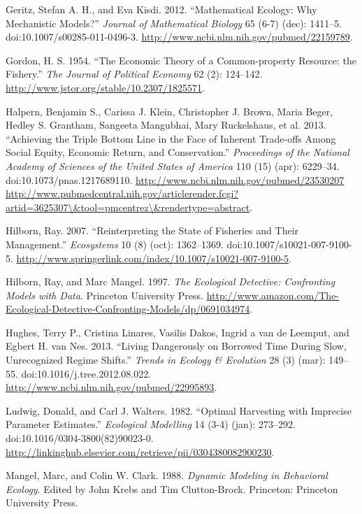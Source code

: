 \documentclass[author-year, review]{elsarticle} %
\begin{document}
Geritz, Stefan A. H., and Eva Kisdi. 2012. ``Mathematical Ecology: Why
Mechanistic Models?'' \emph{Journal of Mathematical Biology} 65 (6-7)
(dec): 1411--5. doi:10.1007/s00285-011-0496-3.
\url{http://www.ncbi.nlm.nih.gov/pubmed/22159789}.

Gordon, H. S. 1954. ``The Economic Theory of a Common-property Resource:
the Fishery.'' \emph{The Journal of Political Economy} 62 (2): 124--142.
\url{http://www.jstor.org/stable/10.2307/1825571}.

Halpern, Benjamin S., Carissa J. Klein, Christopher J. Brown, Maria
Beger, Hedley S. Grantham, Sangeeta Mangubhai, Mary Ruckelshaus, et al.
2013. ``Achieving the Triple Bottom Line in the Face of Inherent
Trade-offs Among Social Equity, Economic Return, and Conservation.''
\emph{Proceedings of the National Academy of Sciences of the United
States of America} 110 (15) (apr): 6229--34.
doi:10.1073/pnas.1217689110.
\href{http://www.ncbi.nlm.nih.gov/pubmed/23530207 http://www.pubmedcentral.nih.gov/articlerender.fcgi?artid=3625307/\&tool=pmcentrez/\&rendertype=abstract}{http://www.ncbi.nlm.nih.gov/pubmed/23530207
http://www.pubmedcentral.nih.gov/articlerender.fcgi?artid=3625307\textbackslash{}\&tool=pmcentrez\textbackslash{}\&rendertype=abstract}.

Hilborn, Ray. 2007. ``Reinterpreting the State of Fisheries and Their
Management.'' \emph{Ecosystems} 10 (8) (oct): 1362--1369.
doi:10.1007/s10021-007-9100-5.
\url{http://www.springerlink.com/index/10.1007/s10021-007-9100-5}.

Hilborn, Ray, and Marc Mangel. 1997. \emph{The Ecological Detective:
Confronting Models with Data}. Princeton University Press.
\url{http://www.amazon.com/The-Ecological-Detective-Confronting-Models/dp/0691034974}.

Hughes, Terry P., Cristina Linares, Vasilis Dakos, Ingrid a van de
Leemput, and Egbert H. van Nes. 2013. ``Living Dangerously on Borrowed
Time During Slow, Unrecognized Regime Shifts.'' \emph{Trends in Ecology
\& Evolution} 28 (3) (mar): 149--55. doi:10.1016/j.tree.2012.08.022.
\url{http://www.ncbi.nlm.nih.gov/pubmed/22995893}.

Ludwig, Donald, and Carl J. Walters. 1982. ``Optimal Harvesting with
Imprecise Parameter Estimates.'' \emph{Ecological Modelling} 14 (3-4)
(jan): 273--292. doi:10.1016/0304-3800(82)90023-0.
\url{http://linkinghub.elsevier.com/retrieve/pii/0304380082900230}.

Mangel, Marc, and Colin W. Clark. 1988. \emph{Dynamic Modeling in
Behavioral Ecology}. Edited by John Krebs and Tim Clutton-Brock.
Princeton: Princeton University Press.
\end{document}
